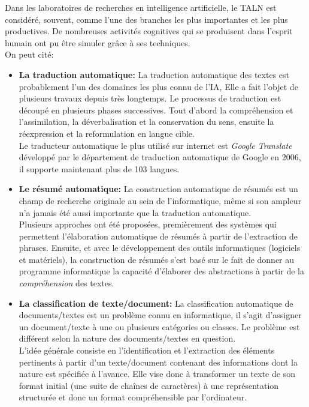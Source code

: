 \documentclass{report}
\begin{document}
Dans les laboratoires de recherches en intelligence artificielle, le TALN est considéré, souvent, comme l'une des branches les plus importantes et les plus productives. De nombreuses activités cognitives qui se produisent dans l'esprit humain ont pu être simuler grâce à ses techniques.\\
On peut cité: 
\begin{itemize}
    \item \textbf{La traduction automatique:}
    La traduction automatique des textes est probablement l'un des domaines les plus connu de l'IA, Elle a fait l'objet de plusieurs travaux depuis très longtemps. Le processus de traduction est découpé en plusieurs phases successives. Tout d'abord la compréhension et l'assimilation, la déverbalisation et la conservation du sens, ensuite la réexpression et la reformulation en langue cible.\\
    Le traducteur automatique le plus utilisé sur internet est \emph{Google Translate} développé par le département de traduction automatique de Google en 2006, il supporte maintenant plus de 103 langues.

    \item \textbf{Le résumé automatique:}
    La construction automatique de résumés est un champ de recherche originale au sein de l'informatique, même si son ampleur n'a jamais été aussi importante que la traduction automatique.\\
    Plusieurs approches ont été proposées, premièrement des systèmes qui permettent l'élaboration automatique de résumés à partir de l'extraction de phrases. Ensuite, et avec le développement des outils informatiques (logiciels et matériels), la construction de résumés s'est basé sur le fait de donner au programme informatique la capacité d'élaborer des abstractions à partir de la \emph{compréhension} des textes.

    \item \textbf{La classification de texte/document:}
    La classification automatique de documents/textes est un problème connu en informatique, il s'agit d'assigner un document/texte à une ou plusieurs catégories ou classes. Le problème est différent selon la nature des documents/textes en question.\\
    L'idée générale consiste en l'identification et l'extraction des éléments pertinents à partir d'un texte/document contenant des informations dont la nature est spécifiée à l'avance. Elle vise donc à transformer un texte de son format initial (une suite de chaînes de caractères) à une représentation structurée et donc un format compréhensible par l'ordinateur.\\
\end{itemize}
\end{document}
